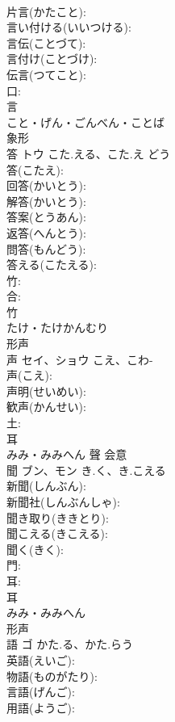 \documentclass[8pt]{extreport}
\begin{document}
\begin{CJK}{UTF8}{min}
\\	片言(かたこと): 
\\	言い付ける(いいつける): 
\\	言伝(ことづて): 
\\	言付け(ことづけ): 
\\	伝言(つてこと): 
\\	口: 
\\	言	
\\	こと・げん・ごんべん・ことば	
\\	象形 
\\	答	トウ	こた.える、こた.え	どう	
\\	答(こたえ): 
\\	回答(かいとう): 
\\	解答(かいとう): 
\\	答案(とうあん): 
\\	返答(へんとう): 
\\	問答(もんどう): 
\\	答える(こたえる): 
\\	竹: 
\\	合: 
\\	竹	
\\	たけ・たけかんむり	
\\	形声 
\\	声	セイ、ショウ	こえ、こわ-		
\\	声(こえ): 
\\	声明(せいめい): 
\\	歓声(かんせい): 
\\	土: 
\\	耳	
\\	みみ・みみへん	聲	会意 
\\	聞	ブン、モン	き.く、き.こえる		
\\	新聞(しんぶん): 
\\	新聞社(しんぶんしゃ): 
\\	聞き取り(ききとり): 
\\	聞こえる(きこえる): 
\\	聞く(きく): 
\\	門: 
\\	耳: 
\\	耳	
\\	みみ・みみへん	
\\	形声 
\\	語	ゴ	かた.る、かた.らう		
\\	英語(えいご): 
\\	物語(ものがたり): 
\\	言語(げんご): 
\\	用語(ようご): 

\end{CJK}
\end{document}

